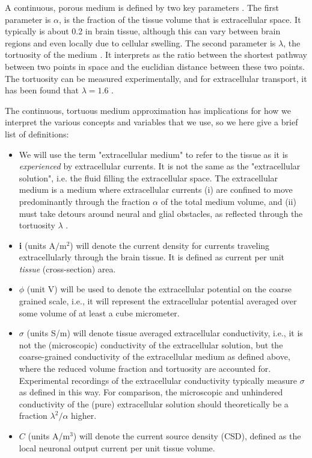 A continuous, porous medium is defined by two key parameters \cite{Nicholson1981}. The first parameter is $\alpha$, is the fraction of the tissue volume that is extracellular space. It typically is about 0.2 in brain tissue, although this can vary between brain regions and even locally due to cellular swelling. The second parameter is $\lambda$, the tortuosity of the medium \cite{Nicholson1981}. It interprets as the ratio between the shortest pathway between two points in space and the euclidian distance between these two points. The tortuosity can be measured experimentally, and for extracellular transport, it has been found that $\lambda = 1.6$ \cite{Nicholson1998}. 

The continuous, tortuous medium approximation has implications for how we interpret the various concepts and variables that we use, so we here give a brief list of definitions: 

\begin{itemize}
\item We will use the term "extracellular medium" to refer to the tissue as it is \textit{experienced} by extracellular currents. It is not the same as the "extracellular solution", i.e. the fluid filling the extracellular space. The extracellular medium is a medium where extracellular currents (i) are confined to move predominantly through the fraction $\alpha$ of the total medium volume, and (ii) must take detours around neural and glial obstacles, as reflected through the tortuosity $\lambda$ \citep{Nicholson1998, Nunez2006}. 

\item  {\bf i} (units $\mathrm{A/m^2}$) will denote the current density for currents traveling extracellularly through the brain tissue. It is defined as current per unit \textit{tissue} (cross-section) area.

\item $\phi$ (unit V) will be used to denote the extracellular potential on the coarse grained scale, i.e., it will represent the extracellular potential averaged over some volume of at least a cube micrometer.

\item $\sigma$ (units S/m) will denote tissue averaged extracellular conductivity, i.e., it is not the (microscopic) conductivity of the extracellular solution, but the coarse-grained conductivity of the extracellular medium as defined above, where the reduced volume fraction and tortuosity are accounted for. Experimental recordings of the extracellular conductivity typically measure 
$\sigma$ as defined in this way. For comparison, the microscopic and unhindered conductivity of the (pure) extracellular solution should theoretically be a fraction $\lambda^2/\alpha$ higher. 

\item $C$ (units A/m$^3$) will denote the current source density (CSD), defined as the local neuronal output current per unit tissue volume.

\end{itemize}

